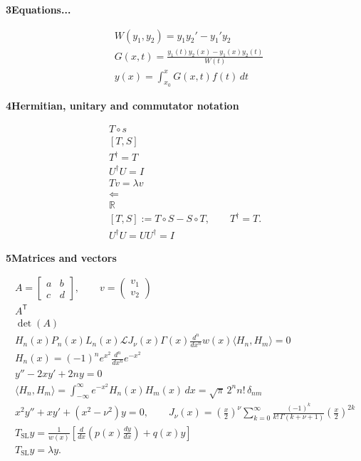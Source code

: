 \documentclass[12pt]{article}
\newcommand{\problem}[2]{%
    \par\vspace{1em}
    \noindent\textbf{#1\quad #2}
    \par\smallskip
}
\begin{document}
\pagebreak

\problem{3}{Equations...}
\begin{align}
    &W(y_1,y_2) = y_1y_2' - y_1'y_2 \\
    &G(x,t) = \frac{y_1(t)y_2(x) - y_1(x)y_2(t)}{W(t)} \\
    &y(x) = \int_{x_0}^x G(x,t)f(t)\,dt
\end{align}

\problem{4}{Hermitian, unitary and commutator notation}
\begin{equation}
    \begin{gathered}
    T\circ s\\
    \left[T,S\right]\\
    T^\dagger = T\\
    U^\dagger U = I\\
    Tv = \lambda v\\
    \Longleftarrow\\
    \mathbb{R}\\
    [T,S] := T\circ S - S\circ T,
    \qquad
    T^\dagger = T.\\
    U^\dagger U = U U^\dagger = I
    \end{gathered}
\end{equation}

\pagebreak

\problem{5}{Matrices and vectors}
\begin{equation}
    \begin{gathered}
        A = 
        \begin{bmatrix}
        a & b \\c & d
        \end{bmatrix},
        \qquad
        v = 
        \begin{pmatrix}
            v_1 \\ v_2
        \end{pmatrix} \\
        A^{\mathsf T} \\
        \det(A)  \\ %
        H_n(x) P_n(x) L_n(x) \mathcal{L} J_\nu(x) \Gamma(x)\frac{d^n}{dx^n}w(x)\langle H_n,H_m\rangle = 0 \\
        H_n(x)=(-1)^n e^{x^2} \frac{d^n}{dx^n}e^{-x^2} \\
        y'' - 2xy' + 2ny = 0\\
        \langle H_n,H_m \rangle
        = \int_{-\infty}^{\infty} e^{-x^2} H_n(x)H_m(x)\,dx
        = \sqrt{\pi}\,2^n n!\,\delta_{nm} \\
        x^2 y'' + xy' + (x^2-\nu^2)y = 0,
        \qquad
        J_\nu(x) = 
        \left(\frac{x}{2}\right)^\nu
        \sum_{k=0}^{\infty}
        \frac{(-1)^k}{k!\,\Gamma(k+\nu+1)}
        \left(\frac{x}{2}\right)^{2k} \\
        T_{\mathrm{SL}} y = 
        \frac{1}{w(x)} \left[\frac{d}{dx}\left(p(x)\frac{dy}{dx}\right) + q(x)y\right]\\
        T_{\mathrm{SL}}y = \lambda y.
    \end{gathered}
\end{equation}
\end{document}
